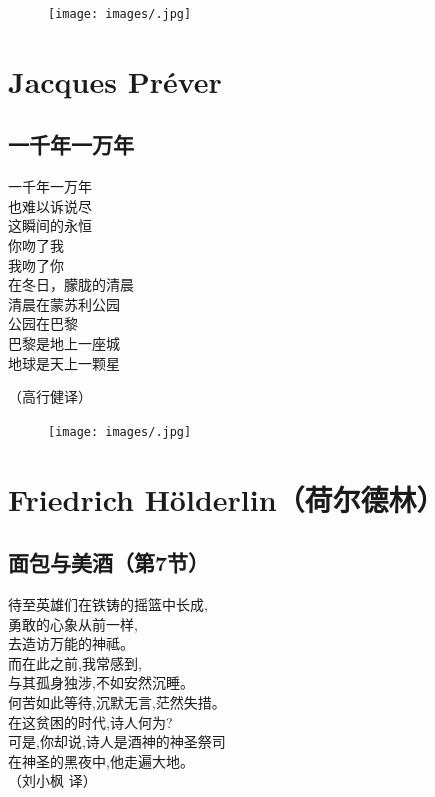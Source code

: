 \documentclass[]{book}
\renewenvironment{quote}{\begin{VF}}{\end{VF}}
\begin{document}
\begin{figure}[htbp]
\centering
\texttt{[image: images/.jpg]}
\caption{}
\end{figure}

\chapter{Jacques Préver}\label{jacques-prever}

\section{一千年一万年}

\begin{quote}
一千年一万年\\
也难以诉说尽\\
这瞬间的永恒\\
你吻了我\\
我吻了你\\
在冬日，朦胧的清晨\\
清晨在蒙苏利公园\\
公园在巴黎\\
巴黎是地上一座城\\
地球是天上一颗星

（高行健译）
\end{quote}

\begin{figure}[htbp]
\centering
\texttt{[image: images/.jpg]}
\caption{}
\end{figure}

\chapter{Friedrich Hölderlin（荷尔德林）}\label{friedrich-holderlin}

\section{面包与美酒（第7节）}\label{7}

\begin{quote}
待至英雄们在铁铸的摇篮中长成,\\
勇敢的心象从前一样,\\
去造访万能的神祗。\\
而在此之前,我常感到,\\
与其孤身独涉,不如安然沉睡。\\
何苦如此等待,沉默无言,茫然失措。\\
在这贫困的时代,诗人何为?\\
可是,你却说,诗人是酒神的神圣祭司\\
在神圣的黑夜中,他走遍大地。\\
（刘小枫 译）
\end{quote}
\end{document}
